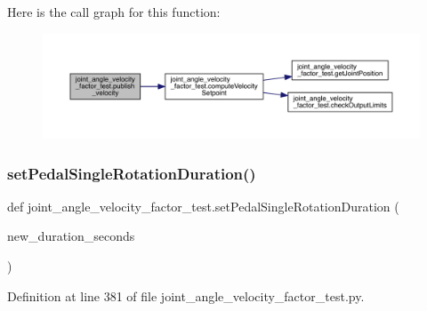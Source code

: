 Here is the call graph for this function\+:\nopagebreak
\begin{figure}[H]
\begin{center}
\leavevmode
\includegraphics[width=350pt]{namespacejoint__angle__velocity__factor__test_ab606d4f2199d00da06c6035cce974ad4_cgraph}
\end{center}
\end{figure}
\mbox{\label{namespacejoint__angle__velocity__factor__test_a4b7edc3596e3eab9bedf14e023ccd75b}} 
\subsubsection{\texorpdfstring{setPedalSingleRotationDuration()}{setPedalSingleRotationDuration()}}
{\footnotesize\ttfamily def joint\+\_\+angle\+\_\+velocity\+\_\+factor\+\_\+test.\+set\+Pedal\+Single\+Rotation\+Duration (\begin{DoxyParamCaption}\item[{}]{new\+\_\+duration\+\_\+seconds }\end{DoxyParamCaption})}



Definition at line 381 of file joint\+\_\+angle\+\_\+velocity\+\_\+factor\+\_\+test.\+py.


